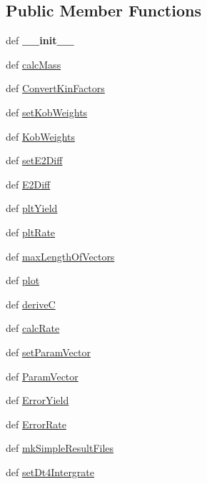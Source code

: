 \subsection*{\-Public \-Member \-Functions}
\begin{DoxyCompactItemize}
\item 
\hypertarget{classModels_1_1KobayashiPCCL_a7b363dff31890fad701f0e752b533391}{def {\bfseries \-\_\-\-\_\-init\-\_\-\-\_\-}}\label{classModels_1_1KobayashiPCCL_a7b363dff31890fad701f0e752b533391}

\item 
def \hyperlink{classModels_1_1KobayashiPCCL_a247e1886dafcb2629777bf6feb7d7f4c}{calc\-Mass}
\item 
def \hyperlink{classModels_1_1KobayashiPCCL_ad541181972142ac989d44d0a3b070847}{\-Convert\-Kin\-Factors}
\item 
def \hyperlink{classModels_1_1KobayashiPCCL_a1c7786daeb39d647abbe428adc0f6f03}{set\-Kob\-Weights}
\item 
def \hyperlink{classModels_1_1KobayashiPCCL_a038ff70977e6017b498f584d6a855be1}{\-Kob\-Weights}
\item 
def \hyperlink{classModels_1_1KobayashiPCCL_a30e2e0c8835c4b3cb9a9af52ca9b1fd5}{set\-E2\-Diff}
\item 
def \hyperlink{classModels_1_1KobayashiPCCL_ae26d3a16a364aae97be94e420c897fc4}{\-E2\-Diff}
\item 
def \hyperlink{classModels_1_1Model_a317ed848b969dbe3a96dd05e8b771900}{plt\-Yield}
\item 
def \hyperlink{classModels_1_1Model_aa35c741babf8f141df48c4021e0664e4}{plt\-Rate}
\item 
def \hyperlink{classModels_1_1Model_a3396d6ca1a7b7d66e55ada8c3c7a509e}{max\-Length\-Of\-Vectors}
\item 
def \hyperlink{classModels_1_1Model_ae404a691e48bfe4eafcdfdd09f1dae48}{plot}
\item 
def \hyperlink{classModels_1_1Model_a010945ed2adff59a7a5fce36025e7a97}{derive\-C}
\item 
def \hyperlink{classModels_1_1Model_a7c9280e33f9e0d46703cebc131008c65}{calc\-Rate}
\item 
def \hyperlink{classModels_1_1Model_a818f207e2a4bd0e9a3720ca611960e5a}{set\-Param\-Vector}
\item 
def \hyperlink{classModels_1_1Model_a13c76a0fe24d43cdc4d21fbc73fa96fa}{\-Param\-Vector}
\item 
def \hyperlink{classModels_1_1Model_ad3e627980d9e781bf7b2c9ff900ca06b}{\-Error\-Yield}
\item 
def \hyperlink{classModels_1_1Model_a3050eb39341f318d8d88b172f88bd240}{\-Error\-Rate}
\item 
def \hyperlink{classModels_1_1Model_adcb987bccae63a742490ea1e6d5f7a74}{mk\-Simple\-Result\-Files}
\item 
def \hyperlink{classModels_1_1Model_ac28252ae5cd6b5ecd4c5d006a0e6567d}{set\-Dt4\-Intergrate}
\end{DoxyCompactItemize}
